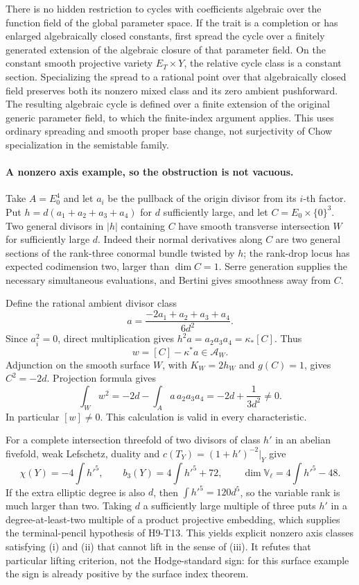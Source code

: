 \documentclass[11pt,a4paper]{article}
\begin{document}
There is no hidden restriction to cycles with coefficients algebraic
over the function field of the global parameter space. If the
trait is a completion or has enlarged algebraically closed constants,
first spread the cycle over a finitely generated extension of the
algebraic closure of that parameter field. On the constant smooth
projective variety $E_T\times Y$, the relative cycle class is a
constant section. Specializing the spread to a rational point over
that algebraically closed field preserves both its nonzero mixed
class and its zero ambient pushforward. The resulting algebraic
cycle is defined over a finite extension of the original generic
parameter field, to which the finite-index argument applies.
This uses ordinary spreading and smooth proper base change, not
surjectivity of Chow specialization in the semistable family.

\paragraph{A nonzero axis example, so the obstruction is not vacuous.}
Take $A=E_0^4$ and let $a_i$ be the pullback of the origin divisor
from its $i$-th factor. Put $h=d(a_1+a_2+a_3+a_4)$ for $d$ sufficiently
large, and let
$C=E_0\times\{0\}^3$. Two general divisors in $|h|$ containing
$C$ have smooth transverse intersection $W$ for sufficiently large
$d$. Indeed their normal derivatives along $C$ are two general
sections of the rank-three conormal bundle twisted by $h$; the
rank-drop locus has expected codimension two, larger than
$\dim C=1$. Serre generation supplies the necessary simultaneous
evaluations, and Bertini gives smoothness away from $C$.

Define the rational ambient divisor class
\[
 a=\frac{-2a_1+a_2+a_3+a_4}{6d^2}.
\]
Since $a_i^2=0$, direct multiplication gives
$h^2a=a_2a_3a_4=\kappa_*[C]$. Thus
\[
                 w=[C]-\kappa^*a\in\mathcal A_W.
\]
Adjunction on the smooth surface $W$, with $K_W=2h_W$ and
$g(C)=1$, gives $C^2=-2d$. Projection formula gives
\[
 \int_Ww^2
   =-2d-\int_Aa\,a_2a_3a_4
   =-2d+\frac1{3d^2}\ne0.                                 \tag{H9.75}
\]
In particular $[w]\ne0$. This calculation is valid in every
characteristic.

For a complete intersection threefold of two divisors of class
$h'$ in an abelian fivefold, weak Lefschetz, duality and
$c(T_Y)=(1+h')^{-2}|_Y$ give
\[
 \chi(Y)=-4\int h'^5,\qquad
 b_3(Y)=4\int h'^5+72,\qquad
 \dim\mathbb V_\ell=4\int h'^5-48.                          \tag{H9.76}
\]
If the extra elliptic degree is also $d$, then
$\int h'^5=120d^5$, so the variable rank is much larger than two.
Taking $d$ a sufficiently large multiple of three puts $h'$ in a
degree-at-least-two multiple of a product projective embedding,
which supplies the terminal-pencil hypothesis of H9-T13.
This yields explicit nonzero axis classes satisfying (i) and (ii)
that cannot lift in the sense of (iii). It refutes that particular
lifting criterion, not the Hodge-standard sign: for this surface
example the sign is already positive by the surface index theorem.
\end{document}
